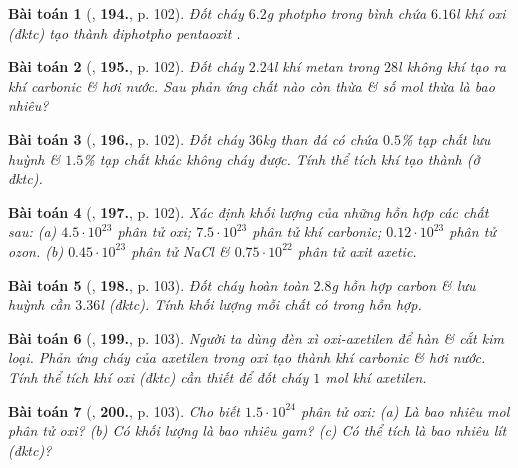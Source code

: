 \documentclass{article}
\numberwithin{equation}{section}
\newtheorem{baitoan}{Bài toán}
\begin{document}
\begin{baitoan}[\cite{An_400_BT_Hoa_Hoc_8_2020}, \textbf{194.}, p. 102]
	Đốt cháy $6.2$\emph{g} photpho trong bình chứa $6.16$\emph{l} khí oxi (đktc) tạo thành điphotpho pentaoxit \emph{}.
\end{baitoan}

\begin{baitoan}[\cite{An_400_BT_Hoa_Hoc_8_2020}, \textbf{195.}, p. 102]
	Đốt cháy $2.24$\emph{l} khí metan trong $28$\emph{l} không khí tạo ra khí carbonic \& hơi nước. Sau phản ứng chất nào còn thừa \& số mol thừa là bao nhiêu?
\end{baitoan}

\begin{baitoan}[\cite{An_400_BT_Hoa_Hoc_8_2020}, \textbf{196.}, p. 102]
	Đốt cháy $36$\emph{kg} than đá có chứa $0.5$\% tạp chất lưu huỳnh \& $1.5$\% tạp chất khác không cháy được. Tính thể tích khí \emph{} tạo thành (ở đktc).
\end{baitoan}

\begin{baitoan}[\cite{An_400_BT_Hoa_Hoc_8_2020}, \textbf{197.}, p. 102]
	Xác định khối lượng của những hỗn hợp các chất sau: (a) $4.5\cdot10^{23}$ phân tử oxi; $7.5\cdot10^{23}$ phân tử khí carbonic; $0.12\cdot10^{23}$ phân tử ozon. (b) $0.45\cdot10^{23}$ phân tử \emph{NaCl} \& $0.75\cdot10^{22}$ phân tử \emph{} axit axetic.
\end{baitoan}

\begin{baitoan}[\cite{An_400_BT_Hoa_Hoc_8_2020}, \textbf{198.}, p. 103]
	Đốt cháy hoàn toàn $2.8$\emph{g} hỗn hợp carbon \& lưu huỳnh cần $3.36$\emph{l} \emph{} (đktc). Tính khối lượng mỗi chất có trong hỗn hợp.
\end{baitoan}

\begin{baitoan}[\cite{An_400_BT_Hoa_Hoc_8_2020}, \textbf{199.}, p. 103]
	Người ta dùng đèn xì oxi-axetilen để hàn \& cắt kim loại. Phản ứng cháy của axetilen \emph{} trong oxi tạo thành khí carbonic \& hơi nước. Tính thể tích khí oxi (đktc) cần thiết để đốt cháy $1$ \emph{mol} khí axetilen.
\end{baitoan}

\begin{baitoan}[\cite{An_400_BT_Hoa_Hoc_8_2020}, \textbf{200.}, p. 103]
	Cho biết $1.5\cdot10^{24}$ phân tử oxi: (a) Là bao nhiêu mol phân tử oxi? (b) Có khối lượng là bao nhiêu gam? (c) Có thể tích là bao nhiêu lít (đktc)?
\end{baitoan}
\end{document}
